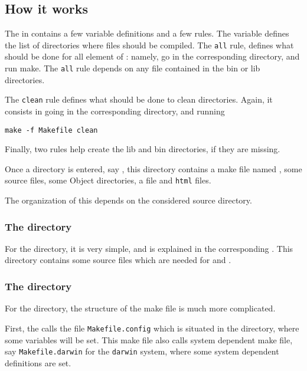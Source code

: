 \documentclass[11pt]{article}
\begin{document}
\subsection{How it works}
The \makefile{} in \sources{} contains a few variable definitions and 
a few rules. The \vardir{} variable defines the list of directories
where files should be compiled. 
The \texttt{all} rule, defines what should be done for all element
of \vardir{}: namely, go in the corresponding directory, and run make. 
The \texttt{all} rule depends on any file contained in the bin or lib
directories. 

The \texttt{clean} rule defines what should be done to clean directories.
Again, it consists in going in the corresponding directory, and running
\begin{verbatim}
make -f Makefile clean
\end{verbatim}

Finally, two rules help create the lib and bin directories, if they
are missing. 

Once a directory is entered, say \pretty{}, this directory contains
a make file named \makefile{}, some source files, some Object
directories, a \readme{} file and \texttt{html} files. 

The organization of this \makefile{} depends on the considered 
source directory. 

\subsubsection{The \pretty{} directory}
For the \pretty{} directory, it is very simple, and is explained in 
the corresponding \makefile{}. This directory contains 
some source files which are needed for \readalfa{} and 
\writealfa{}. 

\subsubsection{The \cgen{} directory}
For the \cgen{} directory, the structure of the make file
is much more complicated. 

First, the \makefile{} calls the file \texttt{Makefile.config} which is
situated in the \makeinclude{} directory, where some variables 
will be set. This make file also calls system dependent make file, 
say \texttt{Makefile.darwin} for the \texttt{darwin} system, where
some system dependent definitions are set. 

\newcommand{\varcppflags}{\texttt{CPPFLAGS}}
\newcommand{\varldflags}{\texttt{LDFLAGS}}
\newcommand{\vardummy}{\texttt{DUMMY}}
\newcommand{\varloadlibes}{\texttt{LOADLIBES}}
\newcommand{\varname}{\texttt{NAME}}
\newcommand{\varobjs}{\texttt{OBJS}}
\newcommand{\varlibs}{\texttt{LIBS}}
\newcommand{\rules}{\texttt{rules}}
\newcommand{\varcc}{\texttt{CC}}
\newcommand{\varpolyinclude}{\texttt{POLYINCLUDE}}
\newcommand{\varbindir}{\texttt{BINDIR}}
\newcommand{\varobjdir}{\texttt{OBJDIR}}
\newcommand{\varextraflags}{\texttt{EXTRA\_FLAGS}}
\end{document}
